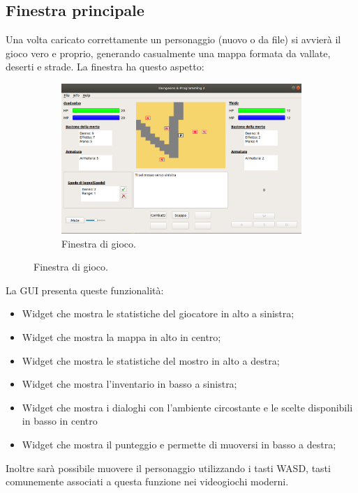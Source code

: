 \documentclass[../relazione.tex]{subfiles}
\begin{document}
\subsection{Finestra principale}
\label{ssec:finestra-principale}
Una volta caricato correttamente un personaggio (nuovo o da file) si avvierà il gioco vero e proprio, generando casualmente una mappa formata da vallate, deserti 
e strade.
La finestra ha questo aspetto:
\begin{figure}[h]
    \centering
    \begin{subfigure}[b]{1\linewidth}
        \includegraphics[width=\linewidth]{img/main_game.png}
        \caption{Finestra di gioco.}
    \end{subfigure}
    \label{fig:main-game}
\end{figure}
La GUI presenta queste funzionalità:
\begin{itemize}
    \item Widget che mostra le statistiche del giocatore in alto a sinistra;
    \item Widget che mostra la mappa in alto in centro;
    \item Widget che mostra le statistiche del mostro in alto a destra;
    \item Widget che mostra l'inventario in basso a sinistra;
    \item Widget che mostra i dialoghi con l'ambiente circostante e le scelte disponibili in basso in centro
    \item Widget che mostra il punteggio e permette di muoversi in basso a destra;
\end{itemize}
Inoltre sarà possibile muovere il personaggio utilizzando i tasti WASD, tasti comunemente associati a questa funzione nei videogiochi moderni.
\end{document}

